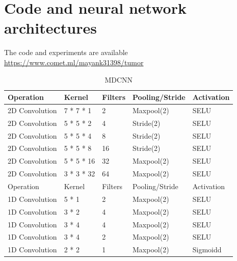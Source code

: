 \documentclass[journal]{IEEEtran}
\begin{document}



\appendices
\section{Code and neural network architectures}

The code and experiments are available \url{https://www.comet.ml/mayank31398/tumor}

\begin{table}[H]
	\caption{MDCNN}
	\centering
	\begin{tabular}{lllll}
		\toprule
		Operation & Kernel & Filters & Pooling/Stride & Activation
		\\ 
		\midrule
		2D Convolution & 7 * 7 * 1 & 2 & Maxpool(2) & SELU
		\\
		2D Convolution & 5 * 5 * 2 & 4 & Stride(2) & SELU
		\\
		2D Convolution & 5 * 5 * 4 & 8 & Stride(2) & SELU
		\\
		2D Convolution & 5 * 5 * 8 & 16 & Stride(2) & SELU
		\\
		2D Convolution & 5 * 5 * 16 & 32 & Maxpool(2) & SELU
		\\
		2D Convolution & 3 * 3 * 32 & 64 & Maxpool(2) & SELU
		\\
		\midrule
		Operation & Kernel & Filters & Pooling/Stride & Activation
		\\
		\midrule
		1D Convolution & 5 * 1 & 2 & Maxpool(2) & SELU
		\\
		1D Convolution & 3 * 2 & 4 & Maxpool(2) & SELU
		\\
		1D Convolution & 3 * 4 & 4 & Maxpool(2) & SELU
		\\
		1D Convolution & 3 * 4 & 2 & Maxpool(2) & SELU
		\\
		1D Convolution & 2 * 2 & 1 & Maxpool(2) & Sigmoidd
		\\
		\bottomrule
	\end{tabular}
\end{table}
\end{document}
